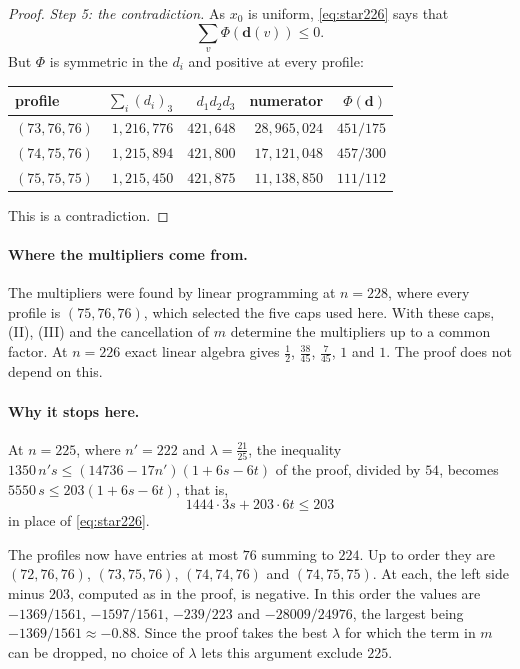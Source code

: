 \documentclass[11pt]{article}
\theoremstyle{spacedplain}
\theoremstyle{spaceddef}
\theoremstyle{spacedremark}
\begin{document}
\begin{proof}
\emph{Step 5: the contradiction.}
As $x_0$ is uniform, \eqref{eq:star226} says that
\[
\sum_v\Phi(\mathbf d(v))\le 0.
\]
But $\Phi$ is symmetric in the $d_i$ and positive at every profile:
\begin{center}\small
\begin{tabular}{lrrrr}
\toprule
profile & $\sum_i(d_i)_3$ & $d_1d_2d_3$ & numerator & $\Phi(\mathbf d)$\\
\midrule
$(73,76,76)$ & $1{,}216{,}776$ & $421{,}648$ & $28{,}965{,}024$ & $451/175$\\
$(74,75,76)$ & $1{,}215{,}894$ & $421{,}800$ & $17{,}121{,}048$ & $457/300$\\
$(75,75,75)$ & $1{,}215{,}450$ & $421{,}875$ & $11{,}138{,}850$ & $111/112$\\
\bottomrule
\end{tabular}
\end{center}
This is a contradiction.
\end{proof}

\paragraph{Where the multipliers come from.}
The multipliers were found by linear programming at $n=228$, where every profile is $(75,76,76)$, which selected the five caps used here.
With these caps, (II), (III) and the cancellation of $m$ determine the multipliers up to a common factor.
At $n=226$ exact linear algebra gives $\frac12$, $\frac{38}{45}$, $\frac{7}{45}$, $1$ and $1$.
The proof does not depend on this.

\paragraph{Why it stops here.}
At $n=225$, where $n'=222$ and $\lambda=\frac{21}{25}$, the inequality $1350\,n's\le(14736-17n')(1+6s-6t)$ of the proof, divided by $54$, becomes $5550\,s\le 203(1+6s-6t)$, that is,
\[
1444\cdot 3s+203\cdot 6t\le 203
\]
in place of \eqref{eq:star226}.

The profiles now have entries at most $76$ summing to $224$.
Up to order they are $(72,76,76)$, $(73,75,76)$, $(74,74,76)$ and $(74,75,75)$.
At each, the left side minus $203$, computed as in the proof, is negative.
In this order the values are $-1369/1561$, $-1597/1561$, $-239/223$ and $-28009/24976$, the largest being $-1369/1561\approx-0.88$.
Since the proof takes the best $\lambda$ for which the term in $m$ can be dropped, no choice of $\lambda$ lets this argument exclude $225$.
\end{document}
